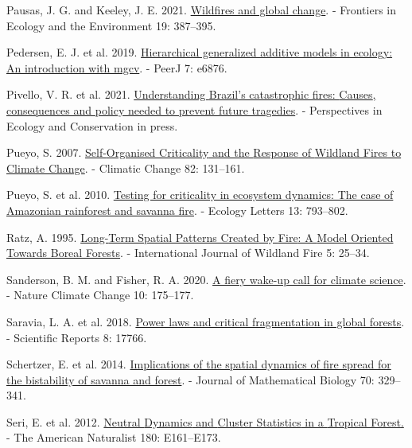 \documentclass[
]{article}
\newlength{\cslhangindent}
\newenvironment{CSLReferences}[2] %
 {\begin{list}{}{%
  \setlength{\itemindent}{0pt}
  \setlength{\leftmargin}{0pt}
  \setlength{\parsep}{0pt}
  \ifodd #1
   \setlength{\leftmargin}{\cslhangindent}
   \setlength{\itemindent}{-1\cslhangindent}
  \fi
  \setlength{\itemsep}{#2\baselineskip}}}
 {\end{list}}
\begin{document}
\begin{CSLReferences}{1}{1}
Pausas, J. G. and Keeley, J. E. 2021.
\href{https://doi.org/10.1002/fee.2359}{Wildfires and global change}. -
Frontiers in Ecology and the Environment 19: 387--395.

Pedersen, E. J. et al. 2019.
\href{https://doi.org/10.7717/peerj.6876}{Hierarchical generalized
additive models in ecology: An introduction with mgcv}. - PeerJ 7:
e6876.

Pivello, V. R. et al. 2021.
\href{https://doi.org/10.1016/j.pecon.2021.06.005}{Understanding
{Brazil}'s catastrophic fires: {Causes}, consequences and policy needed
to prevent future tragedies}. - Perspectives in Ecology and Conservation
in press.

Pueyo, S. 2007.
\href{https://doi.org/10.1007/s10584-006-9134-2}{Self-{Organised
Criticality} and the {Response} of {Wildland Fires} to {Climate
Change}}. - Climatic Change 82: 131--161.

Pueyo, S. et al. 2010.
\href{https://doi.org/10.1111/j.1461-0248.2010.01497.x}{Testing for
criticality in ecosystem dynamics: The case of {Amazonian} rainforest
and savanna fire}. - Ecology Letters 13: 793--802.

Ratz, A. 1995. \href{https://doi.org/10.1071/wf9950025}{Long-{Term
Spatial Patterns Created} by {Fire}: A {Model Oriented Towards Boreal
Forests}}. - International Journal of Wildland Fire 5: 25--34.

Sanderson, B. M. and Fisher, R. A. 2020.
\href{https://doi.org/10.1038/s41558-020-0707-2}{A fiery wake-up call
for climate science}. - Nature Climate Change 10: 175--177.

Saravia, L. A. et al. 2018.
\href{https://doi.org/10.1038/s41598-018-36120-w}{Power laws and
critical fragmentation in global forests}. - Scientific Reports 8:
17766.

Schertzer, E. et al. 2014.
\href{https://doi.org/10.1007/s00285-014-0757-z}{Implications of the
spatial dynamics of fire spread for the bistability of savanna and
forest}. - Journal of Mathematical Biology 70: 329--341.

Seri, E. et al. 2012. \href{https://doi.org/10.1086/668125}{Neutral
{Dynamics} and {Cluster Statistics} in a {Tropical Forest}.} - The
American Naturalist 180: E161--E173.


\end{CSLReferences}
\end{document}
